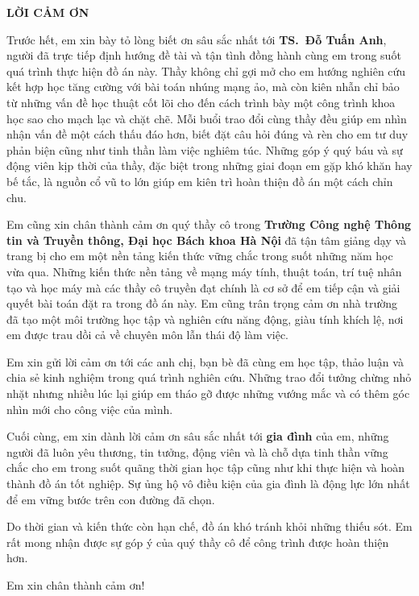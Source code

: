 \documentclass[../DoAn.tex]{subfiles}
\begin{document}
\begin{center}
    \Large{\textbf{LỜI CẢM ƠN}}\\
\end{center}
\vspace{1cm}
Trước hết, em xin bày tỏ lòng biết ơn sâu sắc nhất tới \textbf{TS.~Đỗ Tuấn Anh}, người đã trực tiếp định hướng đề tài và tận tình đồng hành cùng em trong suốt quá trình thực hiện đồ án này. Thầy không chỉ gợi mở cho em hướng nghiên cứu kết hợp học tăng cường với bài toán nhúng mạng ảo, mà còn kiên nhẫn chỉ bảo từ những vấn đề học thuật cốt lõi cho đến cách trình bày một công trình khoa học sao cho mạch lạc và chặt chẽ. Mỗi buổi trao đổi cùng thầy đều giúp em nhìn nhận vấn đề một cách thấu đáo hơn, biết đặt câu hỏi đúng và rèn cho em tư duy phản biện cũng như tinh thần làm việc nghiêm túc. Những góp ý quý báu và sự động viên kịp thời của thầy, đặc biệt trong những giai đoạn em gặp khó khăn hay bế tắc, là nguồn cổ vũ to lớn giúp em kiên trì hoàn thiện đồ án một cách chỉn chu.

Em cũng xin chân thành cảm ơn quý thầy cô trong \textbf{Trường Công nghệ Thông tin và Truyền thông, Đại học Bách khoa Hà Nội} đã tận tâm giảng dạy và trang bị cho em một nền tảng kiến thức vững chắc trong suốt những năm học vừa qua. Những kiến thức nền tảng về mạng máy tính, thuật toán, trí tuệ nhân tạo và học máy mà các thầy cô truyền đạt chính là cơ sở để em tiếp cận và giải quyết bài toán đặt ra trong đồ án này. Em cũng trân trọng cảm ơn nhà trường đã tạo một môi trường học tập và nghiên cứu năng động, giàu tính khích lệ, nơi em được trau dồi cả về chuyên môn lẫn thái độ làm việc.

Em xin gửi lời cảm ơn tới các anh chị, bạn bè đã cùng em học tập, thảo luận và chia sẻ kinh nghiệm trong quá trình nghiên cứu. Những trao đổi tưởng chừng nhỏ nhặt nhưng nhiều lúc lại giúp em tháo gỡ được những vướng mắc và có thêm góc nhìn mới cho công việc của mình.

Cuối cùng, em xin dành lời cảm ơn sâu sắc nhất tới \textbf{gia đình} của em, những người đã luôn yêu thương, tin tưởng, động viên và là chỗ dựa tinh thần vững chắc cho em trong suốt quãng thời gian học tập cũng như khi thực hiện và hoàn thành đồ án tốt nghiệp. Sự ủng hộ vô điều kiện của gia đình là động lực lớn nhất để em vững bước trên con đường đã chọn.

Do thời gian và kiến thức còn hạn chế, đồ án khó tránh khỏi những thiếu sót. Em rất mong nhận được sự góp ý của quý thầy cô để công trình được hoàn thiện hơn.

Em xin chân thành cảm ơn!
\end{document}
